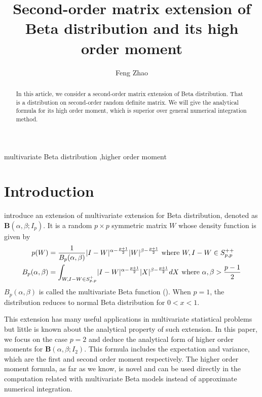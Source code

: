 \documentclass[review,authoryear]{elsarticle}
\DeclarePairedDelimiter\abs{\lvert}{\rvert}
\begin{document}
\begin{frontmatter}
\title{Second-order matrix extension of Beta distribution and its high order moment}
\author[1]{Feng Zhao}
\address[1]{Department of Electronic Engineering, Tsinghua University, Beijing China}

 \begin{abstract}
In this article, we consider a second-order matrix extension of Beta distribution.
That is a distribution on second-order random definite matrix.
We will give the analytical
formula for its high order moment, which is superior over general
numerical integration method.
 \end{abstract}
\begin{keyword}
 multivariate Beta distribution \sep higher order moment
\end{keyword}
\end{frontmatter}
\section{Introduction}
\citet{david1981} introduce an extension of
multivariate extension for Beta distribution,
denoted as $\mathbf{B}(\alpha, \beta; I_p)$.
It is a random $p\times p$  symmetric matrix $W$ whose density
function is given by
\begin{align}
p(W) &= \frac{1}{B_p(\alpha, \beta)}\abs{I-W}^{\alpha-\frac{p+1}{2}}
\abs{W}^{\beta-\frac{p+1}{2}} \textrm{ where } W, I-W \in S_{p,p}^{++}
\label{eq:distr}\\
B_p(\alpha, \beta) &= \int_{W,I-W \in S_{p,p}^{+} }\abs{I-W}^{\alpha-\frac{p+1}{2}}
\abs{X}^{\beta-\frac{p+1}{2}}dX \textrm{ where } \alpha, \beta > \frac{p-1}{2}
\end{align}
$B_p(\alpha, \beta)$ is called the multivariate Beta function (\citet{siegel_1935}).
When $p=1$, the distribution reduces to normal Beta distribution for
$0<x<1$.

This extension has many useful applications in multivariate statistical
problems but little is known about the analytical property of such extension.
In this paper, we focus on the case $p=2$ and deduce the analytical form of 
higher order moments for $\mathbf{B}(\alpha, \beta; I_2)$. This formula
includes the expectation and variance, which are the first and second
order moment respectively. The higher order moment formula, as
far as we know, is novel and can be used directly in the computation
related with multivariate Beta models instead of approximate
numerical integration.
\end{document}
